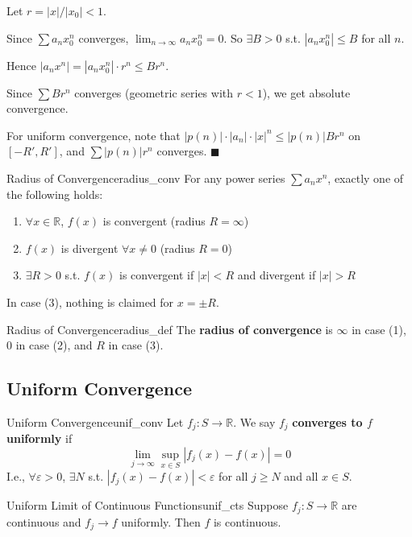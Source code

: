 \documentclass[11pt, letterpaper, openany]{book}
\renewenvironment{proof}[1][\proofname]{%
  \tcolorbox[blanker, breakable, left=1em,
    before skip=1em, after skip=1em,
    borderline west={2pt}{0pt}{MagicTeal!50},
    colback=MagicCream,
    before upper={\textcolor{MagicTeal}{\sffamily\bfseries #1.}\space}
  ]%
}{%
  \hfill\textcolor{MagicTeal}{\ensuremath{\blacksquare}}\endtcolorbox%
}
\begin{document}
\begin{proof}[Sketch]
Let $r = |x|/|x_0| < 1$.

Since $\sum a_n x_0^n$ converges, $\lim_{n \to \infty} a_n x_0^n = 0$. So $\exists B > 0$ s.t. $|a_n x_0^n| \leq B$ for all $n$.

Hence $|a_n x^n| = |a_n x_0^n| \cdot r^n \leq B r^n$.

Since $\sum B r^n$ converges (geometric series with $r < 1$), we get absolute convergence.

For uniform convergence, note that $|p(n)| \cdot |a_n| \cdot |x|^n \leq |p(n)| B r^n$ on $[-R', R']$, and $\sum |p(n)| r^n$ converges.
\end{proof}

\begin{thm}{Radius of Convergence}{radius_conv}
For any power series $\sum a_n x^n$, exactly one of the following holds:
\begin{enumerate}
    \item $\forall x \in \mathbb{R}$, $f(x)$ is convergent (radius $R = \infty$)
    \item $f(x)$ is divergent $\forall x \neq 0$ (radius $R = 0$)
    \item $\exists R > 0$ s.t. $f(x)$ is convergent if $|x| < R$ and divergent if $|x| > R$
\end{enumerate}
In case (3), nothing is claimed for $x = \pm R$.
\end{thm}

\begin{defn}{Radius of Convergence}{radius_def}
The \textbf{radius of convergence} is $\infty$ in case (1), $0$ in case (2), and $R$ in case (3).
\end{defn}

\subsection{Uniform Convergence}

\begin{defn}{Uniform Convergence}{unif_conv}
Let $f_j: S \to \mathbb{R}$. We say $f_j$ \textbf{converges to $f$ uniformly} if
\[\lim_{j \to \infty} \sup_{x \in S} |f_j(x) - f(x)| = 0\]
I.e., $\forall \varepsilon > 0$, $\exists N$ s.t. $|f_j(x) - f(x)| < \varepsilon$ for all $j \geq N$ and all $x \in S$.
\end{defn}

\begin{thm}{Uniform Limit of Continuous Functions}{unif_cts}
Suppose $f_j: S \to \mathbb{R}$ are continuous and $f_j \to f$ uniformly. Then $f$ is continuous.
\end{thm}
\end{document}
